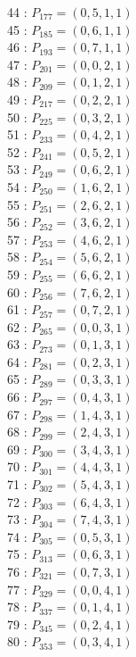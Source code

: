 \documentclass{article}
\begin{document}
{\begin{multicols}{3}
44 : $P_{177}=( 0, 5, 1, 1 )$\\
45 : $P_{185}=( 0, 6, 1, 1 )$\\
46 : $P_{193}=( 0, 7, 1, 1 )$\\
47 : $P_{201}=( 0, 0, 2, 1 )$\\
48 : $P_{209}=( 0, 1, 2, 1 )$\\
49 : $P_{217}=( 0, 2, 2, 1 )$\\
50 : $P_{225}=( 0, 3, 2, 1 )$\\
51 : $P_{233}=( 0, 4, 2, 1 )$\\
52 : $P_{241}=( 0, 5, 2, 1 )$\\
53 : $P_{249}=( 0, 6, 2, 1 )$\\
54 : $P_{250}=( 1, 6, 2, 1 )$\\
55 : $P_{251}=( 2, 6, 2, 1 )$\\
56 : $P_{252}=( 3, 6, 2, 1 )$\\
57 : $P_{253}=( 4, 6, 2, 1 )$\\
58 : $P_{254}=( 5, 6, 2, 1 )$\\
59 : $P_{255}=( 6, 6, 2, 1 )$\\
60 : $P_{256}=( 7, 6, 2, 1 )$\\
61 : $P_{257}=( 0, 7, 2, 1 )$\\
62 : $P_{265}=( 0, 0, 3, 1 )$\\
63 : $P_{273}=( 0, 1, 3, 1 )$\\
64 : $P_{281}=( 0, 2, 3, 1 )$\\
65 : $P_{289}=( 0, 3, 3, 1 )$\\
66 : $P_{297}=( 0, 4, 3, 1 )$\\
67 : $P_{298}=( 1, 4, 3, 1 )$\\
68 : $P_{299}=( 2, 4, 3, 1 )$\\
69 : $P_{300}=( 3, 4, 3, 1 )$\\
70 : $P_{301}=( 4, 4, 3, 1 )$\\
71 : $P_{302}=( 5, 4, 3, 1 )$\\
72 : $P_{303}=( 6, 4, 3, 1 )$\\
73 : $P_{304}=( 7, 4, 3, 1 )$\\
74 : $P_{305}=( 0, 5, 3, 1 )$\\
75 : $P_{313}=( 0, 6, 3, 1 )$\\
76 : $P_{321}=( 0, 7, 3, 1 )$\\
77 : $P_{329}=( 0, 0, 4, 1 )$\\
78 : $P_{337}=( 0, 1, 4, 1 )$\\
79 : $P_{345}=( 0, 2, 4, 1 )$\\
80 : $P_{353}=( 0, 3, 4, 1 )$\\

\end{multicols}}
\end{document}

